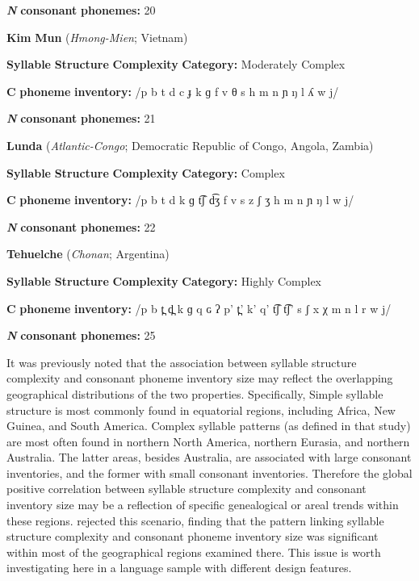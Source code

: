 \textbf{\textit{N}} \textbf{consonant} \textbf{phonemes:} 20

\z

\ea\label{ex:(4.23)}
  \textbf{Kim} \textbf{Mun} (\textit{Hmong-Mien}; Vietnam)

\textbf{Syllable} \textbf{Structure} \textbf{Complexity} \textbf{Category:} Moderately Complex

\textbf{C} \textbf{phoneme} \textbf{inventory:} /p b t d c ɟ k ɡ f v θ s h m n ɲ ŋ l ʎ w j/

\textbf{\textit{N}} \textbf{consonant} \textbf{phonemes:} 21
\z

\ea\label{ex:(4.24)}
  \textbf{Lunda} (\textit{Atlantic-Congo}; Democratic Republic of Congo, Angola, Zambia)

\textbf{Syllable} \textbf{Structure} \textbf{Complexity} \textbf{Category:} Complex

\textbf{C} \textbf{phoneme} \textbf{inventory:} /p b t d k ɡ t͡ʃ d͡ʒ f v s z ʃ ʒ h m n ɲ ŋ l w j/

\textbf{\textit{N}} \textbf{consonant} \textbf{phonemes:} 22
\z

\ea\label{ex:(4.25)}
  \textbf{Tehuelche} (\textit{Chonan}; Argentina)

\textbf{Syllable} \textbf{Structure} \textbf{Complexity} \textbf{Category:} Highly Complex

\textbf{C} \textbf{phoneme} \textbf{inventory:} /p b t̪ d̪ k ɡ q ɢ ʔ p’ t̪’ k’ q’ t͡ʃ t͡ʃ’ s ʃ x χ m n l r w j/

\textbf{\textit{N}} \textbf{consonant} \textbf{phonemes:} 25

\z

  It was previously noted that the association between syllable structure complexity and consonant phoneme inventory size may reflect the overlapping geographical distributions of the two properties. Specifically, Simple syllable structure is most commonly found in equatorial regions, including Africa, New Guinea, and South America. Complex syllable patterns (as defined in that study) are most often found in northern North America, northern Eurasia, and northern Australia. The latter areas, besides Australia, are associated with large consonant inventories, and the former with small consonant inventories. Therefore the global positive correlation between syllable structure complexity and consonant inventory size may be a reflection of specific genealogical or areal trends within these regions. \citet{Maddieson2006} rejected this scenario, finding that the pattern linking syllable structure complexity and consonant phoneme inventory size was significant within most of the geographical regions examined there. This issue is worth investigating here in a language sample with different design features.

